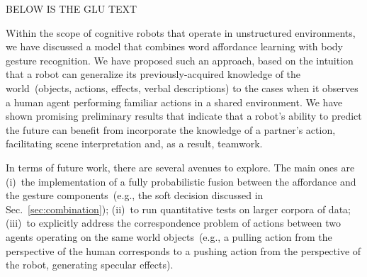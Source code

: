 
BELOW IS THE GLU TEXT

Within the scope of cognitive robots that operate in unstructured environments, we have discussed a model that combines word affordance learning with body gesture recognition. We have proposed such an approach, based on the intuition that a robot can generalize its previously-acquired knowledge of the world~(objects, actions, effects, verbal descriptions) to the cases when it observes a human agent performing familiar actions in a shared \hr{} environment. We have shown promising preliminary results that indicate that a robot's ability to predict the future can benefit from incorporate the knowledge of a partner's action, facilitating scene interpretation and, as a result, teamwork.

In terms of future work, there are several avenues to explore. The main ones are (i)~the implementation of a fully probabilistic fusion between the affordance and the gesture components~(e.g., the soft decision discussed in Sec.~\ref{sec:combination}); (ii)~to run quantitative tests on larger corpora of \hr{} data; (iii)~to explicitly address the correspondence problem of actions between two agents operating on the same world objects~(e.g., a pulling action from the perspective of the human corresponds to a pushing action from the perspective of the robot, generating specular effects).
